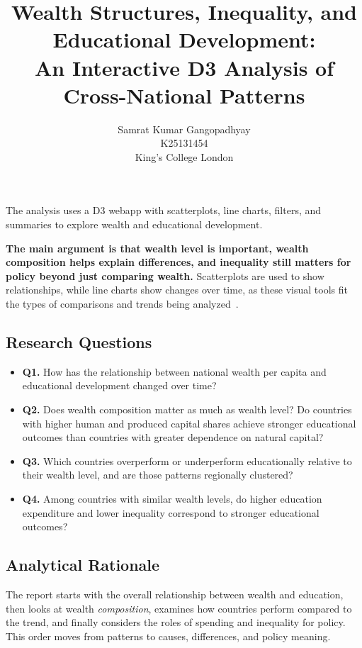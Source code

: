 \documentclass{vgtc}
\title{Wealth Structures, Inequality, and Educational Development:\\
An Interactive D3 Analysis of Cross-National Patterns}
\author{Samrat Kumar Gangopadhyay\\
\scriptsize K25131454\\
\scriptsize King's College London}
\begin{document}
\maketitle

The analysis uses a D3 webapp with scatterplots, line charts, filters, and summaries to explore wealth and educational development.

\textbf{The main argument is that wealth level is important, wealth composition helps explain differences, and inequality still matters for policy beyond just comparing wealth.} Scatterplots are used to show relationships, while line charts show changes over time, as these visual tools fit the types of comparisons and trends being analyzed~\cite{munzner,bostock}.

\subsection{Research Questions}
\begin{itemize}[leftmargin=*, itemsep=0.25em, topsep=0.35em]
  \item \textbf{Q1.} How has the relationship between national wealth per capita and educational development changed over time?
  \item \textbf{Q2.} Does wealth composition matter as much as wealth level? Do countries with higher human and produced capital shares achieve stronger educational outcomes than countries with greater dependence on natural capital?
  \item \textbf{Q3.} Which countries overperform or underperform educationally relative to their wealth level, and are those patterns regionally clustered?
  \item \textbf{Q4.} Among countries with similar wealth levels, do higher education expenditure and lower inequality correspond to stronger educational outcomes?
\end{itemize}

\subsection{Analytical Rationale}
The report starts with the overall relationship between wealth and education, then looks at wealth \emph{composition}, examines how countries perform compared to the trend, and finally considers the roles of spending and inequality for policy. This order moves from patterns to causes, differences, and policy meaning.
\end{document}
